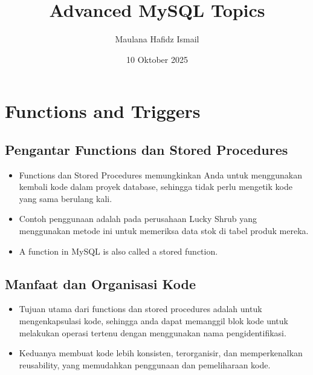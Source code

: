 \documentclass{article}
\title{Advanced MySQL Topics}
\date{10 Oktober 2025}
\author{Maulana Hafidz Ismail}
\begin{document}
\maketitle
\newpage

\tableofcontents
\newpage
{}

\section{Functions and Triggers}
\subsection{Pengantar Functions dan Stored Procedures}
\begin{itemize}
    \item Functions dan Stored Procedures memungkinkan Anda untuk menggunakan kembali kode dalam proyek database, sehingga tidak perlu mengetik kode yang sama berulang kali.
    \item Contoh penggunaan adalah pada perusahaan Lucky Shrub yang menggunakan metode ini untuk memeriksa data stok di tabel produk mereka.
    \item A function in MySQL is also called a stored function.
\end{itemize}

\subsection{Manfaat dan Organisasi Kode}
\begin{itemize}
    \item Tujuan utama dari functions dan stored procedures adalah untuk mengenkapsulasi kode, sehingga anda dapat memanggil blok kode untuk melakukan operasi tertenu dengan menggunakan nama pengidentifikasi.
    \item Keduanya membuat kode lebih konsisten, terorganisir, dan memperkenalkan reusability, yang memudahkan penggunaan dan pemeliharaan kode.
\end{itemize}
\end{document}
